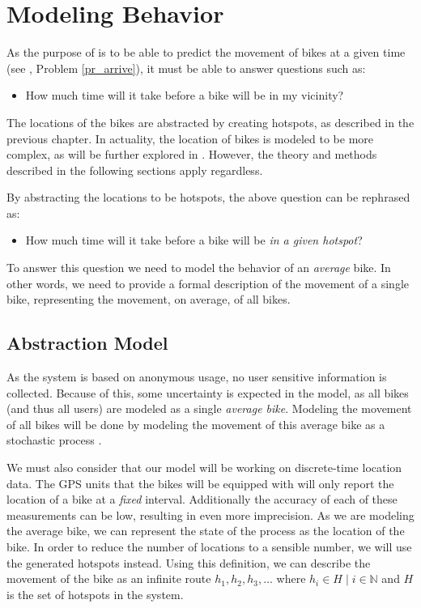 \section{Modeling Behavior}\label{modelbehavior}
As the purpose of \projectname{} is to be able to predict the movement of bikes at a given time (see , Problem \ref{pr_arrive}), it must be able to answer questions such as: 

\begin{itemize}
\item How much time will it take before a bike will be in my vicinity?
\end{itemize}

The locations of the bikes are abstracted by creating hotspots, as described in the previous chapter.
In actuality, the location of bikes is modeled to be more complex, as will be further explored in .
However, the theory and methods described in the following sections apply regardless.

By abstracting the locations to be hotspots, the above question can be rephrased as: 

\begin{itemize}
\item How much time will it take before a bike will be \emph{in a given hotspot}?
\end{itemize}

To answer this question we need to model the behavior of an \emph{average} bike.
In other words, we need to provide a formal description of the movement of a single bike, representing the movement, on average, of all bikes.

\subsection{Abstraction Model}
As the system is based on anonymous usage, no user sensitive information is collected.
Because of this, some uncertainty is expected in the model, as all bikes (and thus all users) are modeled as a single \textit{average bike}.
Modeling the movement of all bikes will be done by modeling the movement of this average bike as a stochastic process \cite{stochastic}.

We must also consider that our model will be working on discrete-time location data.
The GPS units that the bikes will be equipped with will only report the location of a bike at a \textit{fixed} interval.
Additionally the accuracy of each of these measurements can be low, resulting in even more imprecision.
As we are modeling the average bike, we can represent the state of the process as the location of the bike.
In order to reduce the number of locations to a sensible number, we will use the generated hotspots instead.
Using this definition, we can describe the movement of the bike as an infinite route $h_1, h_2, h_3, \dots$ where $h_i \in H \mid i \in \mathbb{N}$ and $H$ is the set of hotspots in the system.

